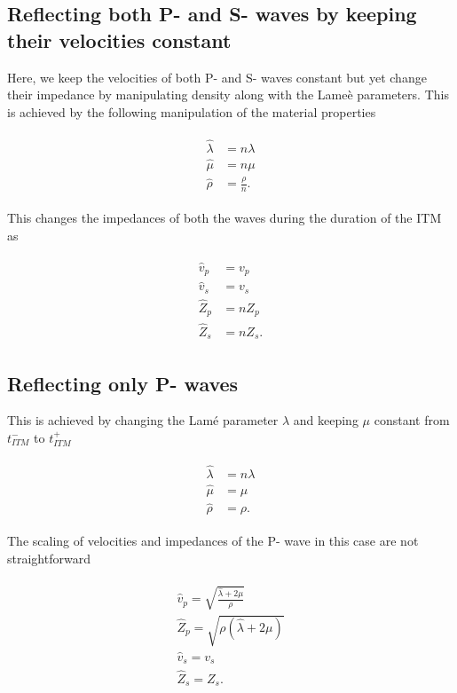 \subsection{Reflecting both P- and S- waves by keeping their velocities constant}
Here, we keep the velocities of both P- and S- waves constant but yet change their impedance by manipulating density along with the Lame\`{e} parameters. This is achieved by the following manipulation of the material properties

\begin{align}
    \begin{split}
        \hat{\lambda} &= n \lambda\\
        \hat{\mu} &= n \mu\\
        \hat{\rho} &= \frac{\rho} {n} .
    \end{split}
\end{align}

This changes the impedances of both the waves during the duration of the \ac{ITM} as

\begin{align}
    \begin{split}
        \hat{v}_p &= v_p \\
        \hat{v}_s &= v_s \\
        \hat{Z}_p &= n Z_p \\
        \hat{Z}_s &= n Z_s .
    \end{split}
\end{align}

\subsection{Reflecting only P- waves}

This is achieved by changing the Lam\'{e} parameter $\lambda$ and keeping $\mu$ constant from $t_{ITM}^-$ to $t_{ITM}^+$

\begin{align}
    \begin{split}
        \hat{\lambda} &= n \lambda \\
        \hat{\mu} &= \mu \\
        \hat{\rho} &= \rho .
    \end{split}
\end{align}

The scaling of velocities and impedances of the P- wave in this case are not straightforward 

\begin{align}
    \begin{split}
        \hat{v}_p = \sqrt{\frac{\hat{\lambda} + 2 \mu}{\rho}} \\
        \hat{Z}_p = \sqrt{\rho\left(\hat{\lambda} + 2 \mu \right)} \\
        \hat{v}_s = v_s \\
        \hat{Z}_s = Z_s . 
    \end{split}
\end{align}

